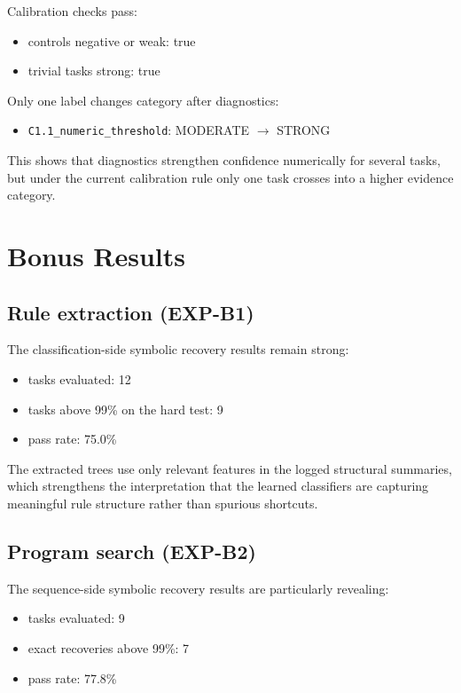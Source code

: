 \documentclass[11pt]{article}
\begin{document}
Calibration checks pass:

\begin{itemize}
  \item controls negative or weak: true
  \item trivial tasks strong: true
\end{itemize}

Only one label changes category after diagnostics:

\begin{itemize}
  \item \texttt{C1.1\_numeric\_threshold}: MODERATE $\rightarrow$ STRONG
\end{itemize}

This shows that diagnostics strengthen confidence numerically for several tasks, but under the current calibration rule only one task crosses into a higher evidence category.

\section{Bonus Results}

\subsection{Rule extraction (EXP-B1)}

The classification-side symbolic recovery results remain strong:

\begin{itemize}
  \item tasks evaluated: 12
  \item tasks above 99\% on the hard test: 9
  \item pass rate: 75.0\%
\end{itemize}

The extracted trees use only relevant features in the logged structural summaries, which strengthens the interpretation that the learned classifiers are capturing meaningful rule structure rather than spurious shortcuts.

\subsection{Program search (EXP-B2)}

The sequence-side symbolic recovery results are particularly revealing:

\begin{itemize}
  \item tasks evaluated: 9
  \item exact recoveries above 99\%: 7
  \item pass rate: 77.8\%
\end{itemize}
\end{document}
